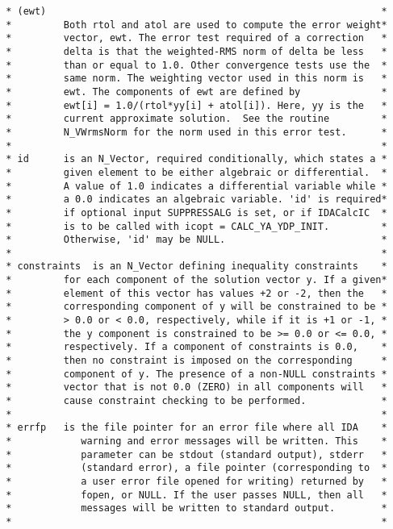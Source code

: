 \begin{verbatim}
 * (ewt)                                                          *
 *         Both rtol and atol are used to compute the error weight*
 *         vector, ewt. The error test required of a correction   *
 *         delta is that the weighted-RMS norm of delta be less   *
 *         than or equal to 1.0. Other convergence tests use the  *
 *         same norm. The weighting vector used in this norm is   *
 *         ewt. The components of ewt are defined by              *
 *         ewt[i] = 1.0/(rtol*yy[i] + atol[i]). Here, yy is the   *
 *         current approximate solution.  See the routine         *
 *         N_VWrmsNorm for the norm used in this error test.      *
 *                                                                *
 * id      is an N_Vector, required conditionally, which states a *
 *         given element to be either algebraic or differential.  *
 *         A value of 1.0 indicates a differential variable while *
 *         a 0.0 indicates an algebraic variable. 'id' is required*
 *         if optional input SUPPRESSALG is set, or if IDACalcIC  *
 *         is to be called with icopt = CALC_YA_YDP_INIT.         *
 *         Otherwise, 'id' may be NULL.                           *
 *                                                                *
 * constraints  is an N_Vector defining inequality constraints    *
 *         for each component of the solution vector y. If a given*
 *         element of this vector has values +2 or -2, then the   *
 *         corresponding component of y will be constrained to be *
 *         > 0.0 or < 0.0, respectively, while if it is +1 or -1, *
 *         the y component is constrained to be >= 0.0 or <= 0.0, *
 *         respectively. If a component of constraints is 0.0,    *
 *         then no constraint is imposed on the corresponding     *
 *         component of y. The presence of a non-NULL constraints *
 *         vector that is not 0.0 (ZERO) in all components will   *
 *         cause constraint checking to be performed.             *
 *                                                                *
 * errfp   is the file pointer for an error file where all IDA    *
 *            warning and error messages will be written. This    *
 *            parameter can be stdout (standard output), stderr   *
 *            (standard error), a file pointer (corresponding to  *
 *            a user error file opened for writing) returned by   *
 *            fopen, or NULL. If the user passes NULL, then all   *
 *            messages will be written to standard output.        *
 *                                                                *

\end{verbatim}
